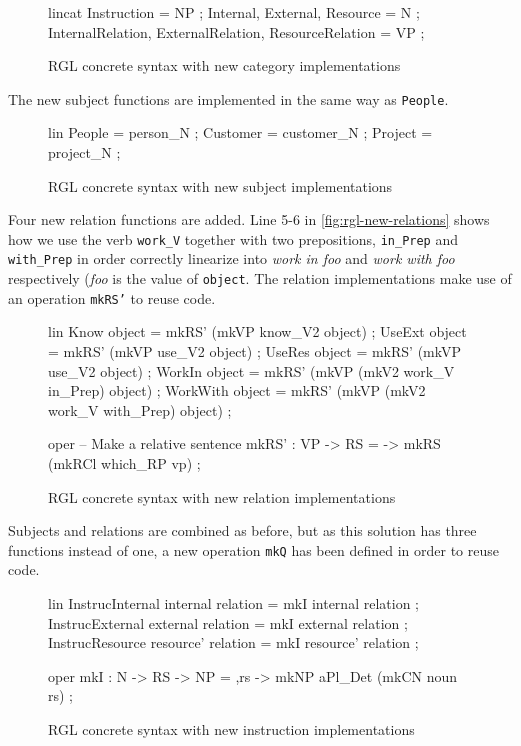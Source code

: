 \begin{figure}[H]
\begin{code}
lincat
  Instruction = NP ;
  Internal, External, Resource = N ;
  InternalRelation, ExternalRelation, ResourceRelation = VP ;
\end{code}
\caption{RGL concrete syntax with new category implementations\label{fig:rgl-new-categories}}
\end{figure}

The new subject functions are implemented in the same way as \texttt{People}.

\begin{figure}[H]
\begin{code}
lin
  People = person_N ;
  Customer = customer_N ;
  Project = project_N ;
\end{code}
\caption{RGL concrete syntax with new subject implementations\label{fig:rgl-new-subjects}}
\end{figure}

Four new relation functions are added. Line 5-6 in \autoref{fig:rgl-new-relations} shows how we use the verb \texttt{work\_V} together with two prepositions, \texttt{in\_Prep} and \texttt{with\_Prep} in order correctly linearize into \emph{work in foo} and \emph{work with foo} respectively (\emph{foo} is the value of \texttt{object}. The relation implementations make use of an operation \texttt{mkRS'} to reuse code.

\begin{figure}[H]
\begin{code}
lin
  Know object = mkRS' (mkVP know_V2 object) ;
  UseExt object = mkRS' (mkVP use_V2 object) ;
  UseRes object = mkRS' (mkVP use_V2 object) ;
  WorkIn object = mkRS' (mkVP (mkV2 work_V in_Prep) object) ;
  WorkWith object = mkRS' (mkVP (mkV2 work_V with_Prep) object) ;

oper
  -- Make a relative sentence
  mkRS' : VP -> RS = \vp -> mkRS (mkRCl which_RP vp) ;
\end{code}
\caption{RGL concrete syntax with new relation implementations\label{fig:rgl-new-relations}}
\end{figure}

Subjects and relations are combined as before, but as this solution has three functions instead of one, a new operation \texttt{mkQ} has been defined in order to reuse code.

\begin{figure}[H]
\begin{code}
lin
  InstrucInternal internal relation = mkI internal relation ;
  InstrucExternal external relation = mkI external relation ;
  InstrucResource resource' relation = mkI resource' relation ;

oper
  mkI : N -> RS -> NP = \noun,rs -> mkNP aPl_Det 
                             (mkCN noun rs) ;
\end{code}
\caption{RGL concrete syntax with new instruction implementations\label{fig:rgl-new-instructions}}
\end{figure}

